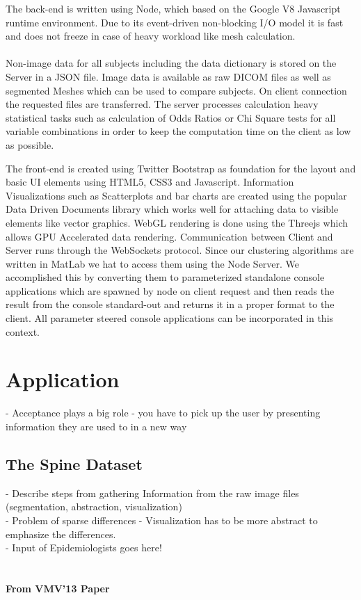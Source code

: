\documentclass[journal]{style/vgtc} 			          %
\begin{document}
The back-end is written using Node, which based on the Google V8 Javascript runtime environment.
%
Due to its event-driven non-blocking I/O model it is fast and does not freeze in case of heavy workload like mesh calculation.
\\\\
Non-image data for all subjects including the data dictionary is stored on the Server in a JSON file.
%
Image data is available as raw DICOM files as well as segmented Meshes which can be used to compare subjects.
%
On client connection the requested files are transferred.
%
The server processes calculation heavy statistical tasks such as calculation of Odds Ratios or Chi Square tests for all variable combinations in order to keep the computation time on the client as low as possible.
%

The front-end is created using Twitter Bootstrap as foundation for the layout and basic UI elements using HTML5, CSS3 and Javascript.
%
Information Visualizations such as Scatterplots and bar charts are created using the popular Data Driven Documents library which works well for attaching data to visible elements like vector graphics.
%
WebGL rendering is done using the Threejs which allows GPU Accelerated data rendering.
%
Communication between Client and Server runs through the WebSockets protocol.
%
Since our clustering algorithms are written in MatLab we hat to access them using the Node Server.
%
We accomplished this by converting them to parameterized standalone console applications which are spawned by node on client request and then reads the result from the console standard-out and returns it in a proper format to the client.
%
All parameter steered console applications can be incorporated in this context.

\section{Application}
- Acceptance plays a big role - you have to pick up the user by presenting information they are used to in a new way
\subsection{The Spine Dataset}
- Describe steps from gathering Information from the raw image files (segmentation, abstraction, visualization)\\
- Problem of sparse differences - Visualization has to be more abstract to emphasize the differences.\\
- Input of Epidemiologists goes here!\\
\\\\
\textbf{From VMV'13 Paper}\\
\end{document}
